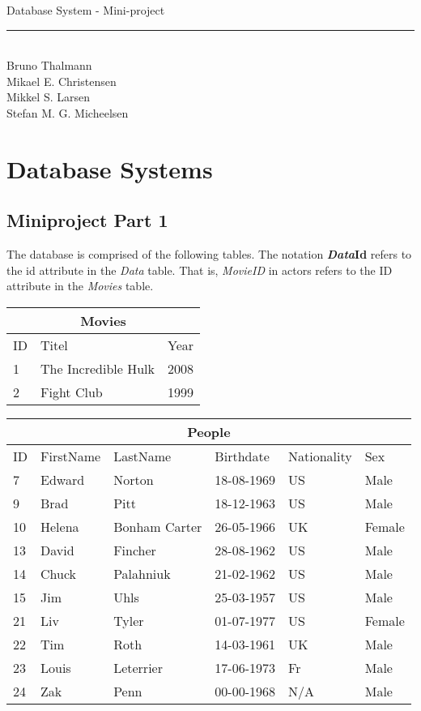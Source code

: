 
\newcommand{\HRule}{\rule{\linewidth}{0.5mm}}


\begin{titlepage}
\centering
{\LARGE Database System - Mini-project}
\HRule \\[0.5cm]
Bruno Thalmann\\
			Mikael E. Christensen\\
			Mikkel S. Larsen\\
			Stefan M. G. Micheelsen
\end{titlepage}

\chapter*{Database Systems}

\section{Miniproject Part 1}
The database is comprised of the following tables.
The notation \textbf{\textit{Data}Id} refers to the id attribute in the \textit{Data} table.
That is, \textit{MovieID} in actors refers to the ID attribute in the \textit{Movies} table.

\begin{center}
\begin{tabular}{|l|l|l|}
\hline
\multicolumn{3}{|c|}{Movies} \\ \hline
ID & Titel & Year \\ \hline
1 & The Incredible Hulk & 2008 \\ \hline
2 & Fight Club & 1999 \\ \hline
\end{tabular}
\end{center}

\begin{center}
\begin{tabular}{|l|l|l|l|l|l|}
\hline
\multicolumn{6}{|c|}{People} \\ \hline
ID & FirstName & LastName & Birthdate & Nationality & Sex \\ \hline
7 & Edward & Norton & 18-08-1969 & US & Male \\ \hline
9 & Brad & Pitt & 18-12-1963 & US & Male \\ \hline
10 & Helena & Bonham Carter & 26-05-1966 & UK & Female \\ \hline
13 & David & Fincher & 28-08-1962 & US & Male \\ \hline
14 & Chuck & Palahniuk & 21-02-1962 & US & Male \\ \hline
15 & Jim & Uhls & 25-03-1957 & US & Male \\ \hline
21 & Liv & Tyler & 01-07-1977 & US & Female \\ \hline
22 & Tim & Roth & 14-03-1961 & UK & Male \\ \hline
23 & Louis & Leterrier & 17-06-1973 & Fr & Male \\ \hline
24 & Zak & Penn & 00-00-1968 & N/A & Male \\ \hline
\end{tabular}
\end{center}

